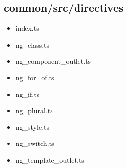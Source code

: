 \subsection{common/src/directives}


\begin{itemize}
  \item index.ts
  \item ng\_class.ts
  \item ng\_component\_outlet.ts
  \item ng\_for\_of.ts
  \item ng\_if.ts
  \item ng\_plural.ts
  \item ng\_style.ts
  \item ng\_switch.ts
  \item ng\_template\_outlet.ts
\end{itemize}


















